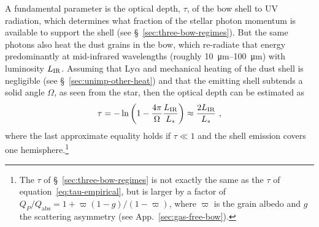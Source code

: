 \message{ !name(bs-bw-dw-03.tex)}\documentclass[useAMS, usenatbib, a4paper]{mnras}
\begin{document}
A fundamental parameter is the optical depth, \(\tau\), of the bow
shell to UV radiation, which determines what fraction of the stellar
photon momentum is available to support the shell (see
\S~\ref{sec:three-bow-regimes}).  But the same photons also heat the
dust grains in the bow, which re-radiate that energy predominantly at
mid-infrared wavelengths (roughly \SIrange{10}{100}{\um}) with
luminosity \(L_{\text{IR}}\).  Assuming that Ly\(\alpha\) and mechanical
heating of the dust shell is negligible (see
\S~\ref{sec:unimp-other-heat}) and that the emitting shell subtends a
solid angle \(\Omega\), as seen from the star, then the optical depth
can be estimated as
\begin{equation}
  \label{eq:tau-empirical}
  \tau = -\ln \left( 1 - \frac{4\pi}{\Omega} \frac{L_{\text{IR}}}{L_*} \right)
  \approx \frac{2 L_{\text{IR}}}{L_*} \ ,
\end{equation}
where the last approximate equality holds if \(\tau \ll 1\) and the
shell emission covers one hemisphere.\footnote{%
  The \(\tau\) of \S~\ref{sec:three-bow-regimes} is not exactly the
  same as the \(\tau\) of equation~\eqref{eq:tau-empirical}, but is
  larger by a factor of
  \(Q_P / Q_{\text{abs}} = 1 + \varpi (1 - g)/(1 - \varpi)\), where
  \(\varpi\) is the grain albedo and \(g\) the scattering asymmetry
  (see App.~\ref{sec:gas-free-bow}).} %
\end{document}
